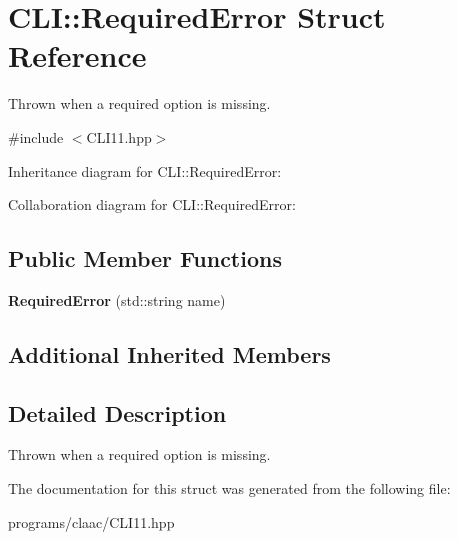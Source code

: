 \hypertarget{struct_c_l_i_1_1_required_error}{}\section{C\+LI\+:\+:Required\+Error Struct Reference}
\label{struct_c_l_i_1_1_required_error}


Thrown when a required option is missing.  




{\ttfamily \#include $<$C\+L\+I11.\+hpp$>$}



Inheritance diagram for C\+LI\+:\+:Required\+Error\+:


Collaboration diagram for C\+LI\+:\+:Required\+Error\+:
\subsection*{Public Member Functions}
\begin{DoxyCompactItemize}
\item 
\mbox{\label{struct_c_l_i_1_1_required_error_a13150580687c3277d6d96cc0959c2adc}} 
{\bfseries Required\+Error} (std\+::string name)
\end{DoxyCompactItemize}
\subsection*{Additional Inherited Members}


\subsection{Detailed Description}
Thrown when a required option is missing. 

The documentation for this struct was generated from the following file\+:\begin{DoxyCompactItemize}
\item 
programs/claac/C\+L\+I11.\+hpp\end{DoxyCompactItemize}
